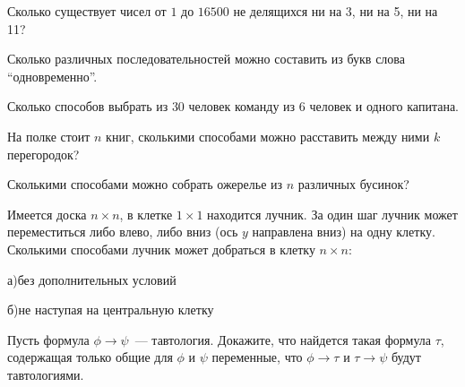 \setcounter{curtask}{9}


\begin{task}
    Сколько существует чисел от $1$ до $16500$ не делящихся ни на 3, ни на 5, ни на
    11?
\end{task}

\begin{task}
    Сколько различных последовательностей можно составить из букв слова ``одновременно''.
\end{task}

\begin{task}
    Сколько способов выбрать из $30$ человек команду из 6 человек и одного капитана.
\end{task}

\begin{task}
    На полке стоит $n$ книг, сколькими способами можно расставить между ними $k$ перегородок?
\end{task}

\begin{task}
    Сколькими способами можно собрать ожерелье из $n$ различных бусинок?
\end{task}

\begin{task}
    Имеется доска $n \times n$, в клетке $1 \times 1$ находится лучник. За один шаг
    лучник может переместиться либо влево, либо вниз (ось $y$ направлена вниз) на
    одну клетку. Сколькими способами лучник может добраться в клетку $n \times n$:
    
    а)без дополнительных условий

    б)не наступая на центральную клетку
\end{task}

\breakline

\begin{ptask}{4}
    Пусть формула $\phi \rightarrow \psi$~--- тавтология. Докажите,
    что найдется такая формула $\tau$, содержащая только общие для
    $\phi$ и $\psi$ переменные, что $\phi \rightarrow \tau$ и
    $\tau \rightarrow \psi$ будут тавтологиями.
\end{ptask}

